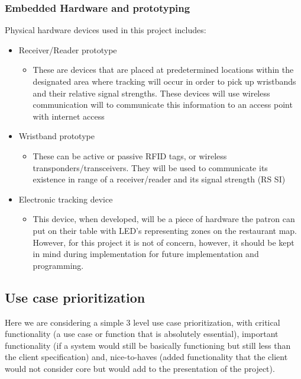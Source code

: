 \documentclass[11pt,titlepage]{article} %
\begin{document}
	\subsubsection{Embedded Hardware and prototyping}
Physical hardware devices used in this project includes:
\begin{itemize}
\item Receiver/Reader prototype
	\begin{itemize}
	\item These  are  devices  that  are  placed  at  predetermined  locations  within  the 
		designated area where tracking will occur in order to pick up wristbands and their relative signal strengths.  				These devices will use wireless communication will to communicate this information to an access point with 					internet access
	\end{itemize}	
\item Wristband prototype
	\begin{itemize}
		\item These  can  be  active  or  passive  RFID  tags,  or 					wireless transponders/transceivers. They will be used to 			communicate its existence in range of a receiver/reader 				and its signal strength (RS SI)
	\end{itemize}
	
\item Electronic tracking device	
\begin{itemize}
\item This device, when developed, will be a piece of hardware the patron can put on their table with LED’s representing zones on the restaurant map. However, for this project it is not of concern, however, it should be kept in mind during implementation for future implementation and programming.
\end{itemize}	
\end{itemize}
	
\subsection{Use case prioritization}
	Here we are considering a simple 3 level use case prioritization, with critical functionality (a use case or function that is absolutely essential), important functionality (if a system would still be basically functioning but still less than the client specification) and, nice-to-haves (added functionality that the client would not consider core but would add to the presentation of the project).
	
\end{document}
